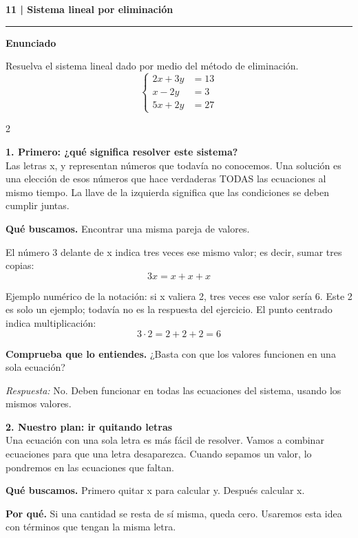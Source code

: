 \documentclass[11pt,a4paper,landscape]{article}
\newcommand{\titulo}[1]{{\LARGE\bfseries #1}\par\smallskip\hrule\medskip}
\begin{document}
\newpage{}\hypertarget{1.1-11}{}
\titulo{11 | Sistema lineal por eliminación}
\textbf{Enunciado}\par Resuelva el sistema lineal dado por medio del método de eliminación.
\[\left\{\begin{aligned}2x + 3y &= 13\\x - 2y &= 3\\5x + 2y &= 27\end{aligned}\right.\]
\begin{multicols*}{2}
\noindent\begin{minipage}{\linewidth}\textbf{1. Primero: ¿qué significa resolver este sistema?}\\[2pt]Las letras x, y representan números que todavía no conocemos. Una solución es una elección de esos números que hace verdaderas TODAS las ecuaciones al mismo tiempo. La llave de la izquierda significa que las condiciones se deben cumplir juntas.
\par\smallskip\textbf{Qué buscamos.} Encontrar una misma pareja de valores.
\par\smallskip El número 3 delante de x indica tres veces ese mismo valor; es decir, sumar tres copias:
\[3x=x+x+x\]
\par\smallskip Ejemplo numérico de la notación: si x valiera 2, tres veces ese valor sería 6. Este 2 es solo un ejemplo; todavía no es la respuesta del ejercicio. El punto centrado indica multiplicación:
\[3\cdot 2=2+2+2=6\]
\par\smallskip\textbf{Comprueba que lo entiendes.} ¿Basta con que los valores funcionen en una sola ecuación?\par\textit{Respuesta:} No. Deben funcionar en todas las ecuaciones del sistema, usando los mismos valores.
\end{minipage}\par\medskip
\noindent\begin{minipage}{\linewidth}\textbf{2. Nuestro plan: ir quitando letras}\\[2pt]Una ecuación con una sola letra es más fácil de resolver. Vamos a combinar ecuaciones para que una letra desaparezca. Cuando sepamos un valor, lo pondremos en las ecuaciones que faltan.
\par\smallskip\textbf{Qué buscamos.} Primero quitar x para calcular y. Después calcular x.
\par\smallskip\textbf{Por qué.} Si una cantidad se resta de sí misma, queda cero. Usaremos esta idea con términos que tengan la misma letra.

\end{minipage}
\end{multicols*}
\end{document}
